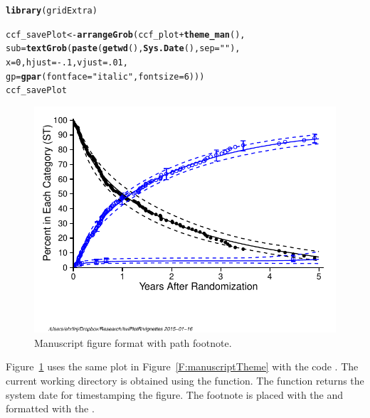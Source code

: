 \documentclass[nojss]{jss}\usepackage[]{graphicx}\usepackage[]{color}
\makeatletter
\def\maxwidth{ %
  \ifdim\Gin@nat@width>\linewidth
    \linewidth
  \else
    \Gin@nat@width
  \fi
}
\newcommand{\hlnum}[1]{\textcolor[rgb]{0.686,0.059,0.569}{#1}}%
\newcommand{\hlstr}[1]{\textcolor[rgb]{0.192,0.494,0.8}{#1}}%
\newcommand{\hlopt}[1]{\textcolor[rgb]{0,0,0}{#1}}%
\newcommand{\hlstd}[1]{\textcolor[rgb]{0.345,0.345,0.345}{#1}}%
\newcommand{\hlkwb}[1]{\textcolor[rgb]{0.69,0.353,0.396}{#1}}%
\newcommand{\hlkwc}[1]{\textcolor[rgb]{0.333,0.667,0.333}{#1}}%
\newcommand{\hlkwd}[1]{\textcolor[rgb]{0.737,0.353,0.396}{\textbf{#1}}}%
\newenvironment{kframe}{%
 \def\at@end@of@kframe{}%
 \ifinner\ifhmode%
  \def\at@end@of@kframe{\end{minipage}}%
  \begin{minipage}{\columnwidth}%
 \fi\fi%
 \def\FrameCommand##1{\hskip\@totalleftmargin \hskip-\fboxsep
 \colorbox{shadecolor}{##1}\hskip-\fboxsep
     \hskip-\linewidth \hskip-\@totalleftmargin \hskip\columnwidth}%
 \MakeFramed {\advance\hsize-\width
   \@totalleftmargin\z@ \linewidth\hsize
   \@setminipage}}%
 {\par\unskip\endMakeFramed%
 \at@end@of@kframe}
\newenvironment{knitrout}{}{} %
\makeatother
\begin{document}
\begin{knitrout}\footnotesize
{}\color{fgcolor}\begin{kframe}
\begin{alltt}
\hlkwd{library}\hlstd{(gridExtra)}

\hlstd{ccf_savePlot} \hlkwb{<-} \hlkwd{arrangeGrob}\hlstd{(ccf_plot}\hlopt{+}\hlkwd{theme_man}\hlstd{(),}
                            \hlkwc{sub} \hlstd{=} \hlkwd{textGrob}\hlstd{(}\hlkwd{paste}\hlstd{(}\hlkwd{getwd}\hlstd{(),} \hlkwd{Sys.Date}\hlstd{(),} \hlkwc{sep}\hlstd{=}\hlstr{" "}\hlstd{),}
                                           \hlkwc{x} \hlstd{=} \hlnum{0}\hlstd{,} \hlkwc{hjust} \hlstd{=} \hlopt{-}\hlnum{.1}\hlstd{,} \hlkwc{vjust}\hlstd{=}\hlnum{.01}\hlstd{,}
                                           \hlkwc{gp} \hlstd{=} \hlkwd{gpar}\hlstd{(}\hlkwc{fontface} \hlstd{=} \hlstr{"italic"}\hlstd{,} \hlkwc{fontsize} \hlstd{=} \hlnum{6}\hlstd{)))}
\hlstd{ccf_savePlot}
\end{alltt}
\end{kframe}\begin{figure}[htpb]

{\centering \includegraphics[width=\maxwidth]{figure/beamer-manuscriptFootnote-1} 

}

\caption[Manuscript figure format with path footnote]{Manuscript figure format with path footnote.\label{F:manuscriptFootnote}}
\end{figure}


\end{knitrout}
Figure~\ref{F:manuscriptFootnote} uses the same plot in Figure~\ref{F:manuscriptTheme} with the code . The current working directory is obtained using the  function. The  function returns the system date for timestamping the figure. The footnote is placed with the  and formatted with the .
\end{document}
